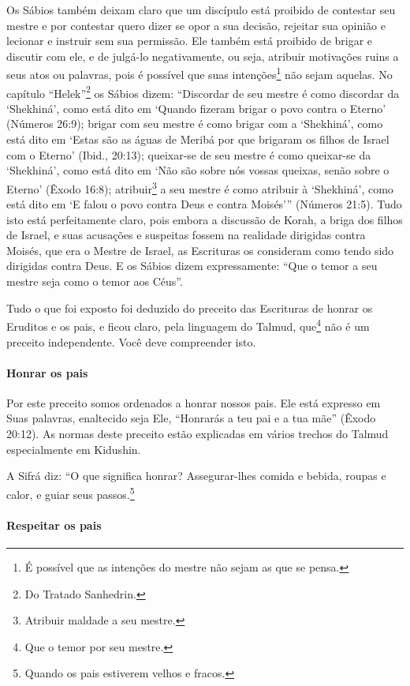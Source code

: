 Os Sábios também deixam claro que um discípulo está proibido de
contestar seu mestre e por contestar quero dizer se opor a sua decisão,
rejeitar sua opinião e lecionar e instruir sem sua permissão. Ele também
está proibido de brigar e discutir com ele, e de julgá-lo negativamente,
ou seja, atribuir motivações ruins a seus atos ou palavras, pois é
possível que suas intenções\footnote{É possível que as intenções do mestre não sejam as que se pensa.} não
sejam aquelas. No capítulo ``Helek''\footnote{Do Tratado Sanhedrin.} os Sábios
dizem: ``Discordar de seu mestre
é como discordar da `Shekhiná', como está dito em `Quando fizeram brigar
o povo contra o Eterno' (Números 26:9); brigar com seu mestre é como
brigar com a `Shekhiná', como está dito em `Estas são as águas de Meribá
por que brigaram os filhos de Israel com o Eterno' (Ibid., 20:13);
queixar-se de seu mestre
é como queixar-se da `Shekhiná', como está dito em `Não são sobre nós
vossas queixas, senão sobre o Eterno' (Êxodo 16:8);
atribuir\footnote{Atribuir maldade a seu mestre.} a seu mestre é como
atribuir à `Shekhiná', como está dito em `E falou o povo contra Deus e
contra Moisés''' (Números 21:5). Tudo isto está perfeitamente claro, pois
embora a discussão de Korah, a briga dos filhos de Israel, e suas
acusações e suspeitas fossem na realidade dirigidas contra Moisés, que
era o Mestre de Israel, as Escrituras os consideram como tendo sido
dirigidas contra Deus. E os Sábios dizem expressamente: ``Que o temor a
seu mestre seja como o temor aos Céus''.

Tudo o que foi exposto foi deduzido do preceito das Escrituras de honrar
os Eruditos e os pais, e ficou claro, pela linguagem do Talmud,
que\footnote{Que o temor por seu mestre.} não é um preceito independente. Você deve
compreender isto.

\paragraph{Honrar os pais}

Por este preceito somos ordenados a honrar nossos pais. Ele está
expresso em Suas palavras, enaltecido seja Ele, ``Honrarás a teu pai e a
tua mãe'' (Êxodo 20:12). As normas deste preceito estão explicadas em
vários trechos do Talmud especialmente em Kidushin.

A Sifrá diz: ``O que significa honrar? Assegurar-lhes comida e bebida, roupas e calor, e guiar seus passos.\footnote{Quando os pais estiverem velhos e fracos.}


\paragraph{Respeitar os pais}

